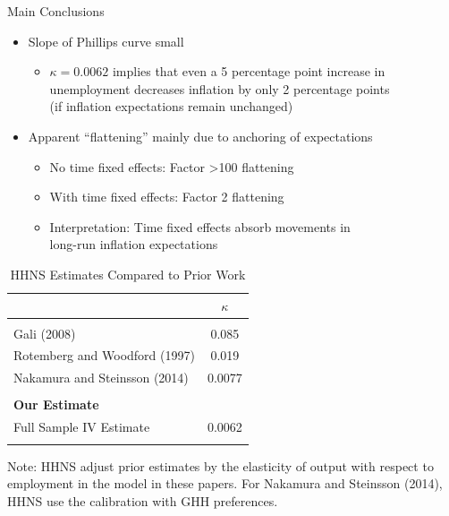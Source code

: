 \documentclass[11pt,aspectratio=169,xcolor={dvipsnames},hyperref={pdftex,pdfpagemode=UseNone,hidelinks,pdfdisplaydoctitle=true},usepdftitle=false]{beamer}
\begin{document}
\begin{frame}{Main Conclusions}
	\begin{itemize}
		\itemsep1em 
		\item Slope of Phillips curve small
		\begin{itemize}
			\item $\kappa = 0.0062$ implies that even a 5 percentage point increase in unemployment decreases inflation by only 2 percentage points \\ (if inflation expectations remain unchanged)
		\end{itemize}
		\item Apparent ``flattening'' mainly due to anchoring of expectations
		\begin{itemize}
			\item No time fixed effects: Factor >100 flattening
			\item With time fixed effects: Factor 2 flattening \vspace{2mm}
			\item Interpretation: Time fixed effects absorb movements in \\ long-run inflation expectations
		\end{itemize}
	\end{itemize}
\end{frame}


\begin{frame}
	\begin{table}
		\centering 
		\small 
		\caption{HHNS Estimates Compared to Prior Work} \vspace{-5pt}
		\begin{tabular}{p{5.5cm}c} \hline \hline
			& $\kappa$ \\ \hline \\ [-2mm]
			Gali (2008) & 0.085 \\
			Rotemberg and Woodford (1997) & 0.019 \\
			Nakamura and Steinsson (2014) & 0.0077 \\ \\ [-2mm]
			\textbf{Our Estimate} \\
			Full Sample IV Estimate & 0.0062 \\ \\ [-2mm] \hline
		\end{tabular}
		\begin{minipage}[c]{4in}
			\footnotesize \baselineskip=11pt \vspace{5pt}
			Note: HHNS adjust prior estimates by the elasticity of output with respect to employment in the model in these papers. For Nakamura and Steinsson (2014), HHNS use the calibration with GHH preferences. 
		\end{minipage}
	\end{table}
\end{frame}
\end{document}
